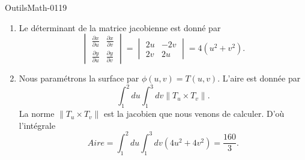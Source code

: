 
\begin{corrige}{OutilsMath-0119}

    \begin{enumerate}
        \item
            Le déterminant de la matrice jacobienne est donné par
            \begin{equation}
                \begin{vmatrix}
                    \frac{ \partial x }{ \partial u }    &   \frac{ \partial x }{ \partial v }    \\ 
                    \frac{ \partial y }{ \partial u }    &   \frac{ \partial y }{ \partial v }    
                \end{vmatrix}=\begin{vmatrix}
                    2u    &   -2v    \\ 
                    2v    &   2u    
                \end{vmatrix}=4(u^2+v^2).
            \end{equation}

        \item
            Nous paramétrons la surface par \( \phi(u,v)=T(u,v)\). L'aire est donnée par
            \begin{equation}
                \int_1^2du\int_1^3dv\| T_u\times T_v \|.
            \end{equation}
            La norme \( \| T_u\times T_v \|\) est la jacobien que nous venons de calculer. D'où l'intégrale
            \begin{equation}
                Aire=\int_1^2du\int_1^3dv(4u^2+4v^2)=\frac{ 160 }{ 3 }.
            \end{equation}
            
            
    \end{enumerate}
    
\end{corrige}
